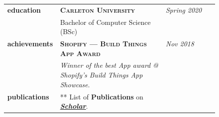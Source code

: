 \documentclass[9pt]{article}
\begin{document}
\begin{longtable}{@{}>{\raggedleft}p{0.25\linewidth}
                          p{}>{}p{0.25\linewidth}@{}}
        \textbf{education}
            & \textbf{\textsc{Carleton University}} & \textit{Spring 2020} \\
            & Bachelor of Computer Science (BSc) \\ [1em]

        \textbf{achievements}
            & \textbf{\textsc{Shopify --- Build Things App Award}} & \textit{Nov 2018} \\
            & \textit{Winner of the best App award @ Shopify's Build Things App Showcase}. \\ [1em]

        \textbf{publications}
            & ** List of \textbf{Publications} on \textit{\href{https://scholar.google.ca/citations?user=zFDREhgAAAAJ\&hl=en}{\textbf{Scholar}}}.\\ [0.5em]


  \end{longtable}
\end{document}
